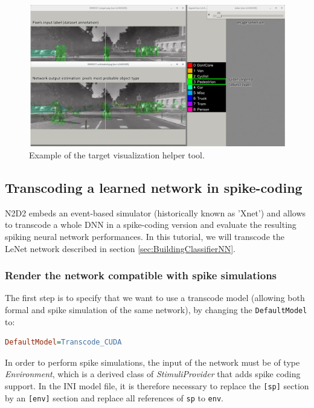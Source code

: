 \documentclass[a4paper,11pt,oneside]{article}
\begin{document}
\begin{figure}[!htb]
  \centering
  \includegraphics[width=1.0\linewidth]{figs/target_visu.pdf}
  \caption{Example of the target visualization helper tool.}
  \label{fig:targetvisu}
\end{figure}


\subsection{Transcoding a learned network in spike-coding}

N2D2 embeds an event-based simulator (historically known as 'Xnet') and allows
to transcode a whole DNN in a spike-coding version and evaluate the resulting
spiking neural network performances. In this tutorial, we will transcode the
LeNet network described in section \ref{sec:BuildingClassifierNN}.

\subsubsection{Render the network compatible with spike simulations}

The first step is to specify that we want to use
a transcode model (allowing both formal and spike simulation of the same
network), by changing the \lstinline!DefaultModel! to:

\begin{lstlisting}[language=ini]
DefaultModel=Transcode_CUDA
\end{lstlisting}

In order to perform spike simulations, the input of the network must be of type
\emph{Environment}, which is a derived class of
\emph{StimuliProvider} that adds spike coding support. In the INI model
file, it is therefore necessary to replace the \lstinline![sp]! section by an
\lstinline![env]! section and replace all references of \lstinline!sp! to
\lstinline!env!.
\end{document}
